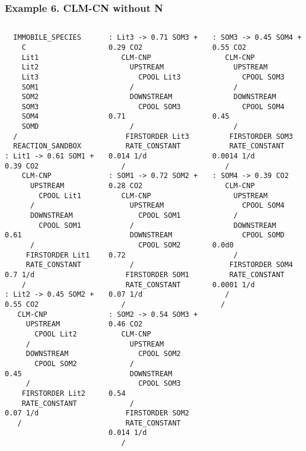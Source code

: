 \documentclass{beamer}
\begin{document}
\begin{frame}[fragile]
\frametitle{Example 6. CLM-CN without N}

\tiny
\begin{columns}
\column{1.5in}
\begin{verbatim}
  IMMOBILE_SPECIES
    C
    Lit1
    Lit2
    Lit3
    SOM1
    SOM2
    SOM3
    SOM4
    SOMD
  /
  REACTION_SANDBOX
: Lit1 -> 0.61 SOM1 + 0.39 CO2 
    CLM-CNP
      UPSTREAM
        CPOOL Lit1
      /
      DOWNSTREAM
        CPOOL SOM1 0.61
      /
     FIRSTORDER Lit1
     RATE_CONSTANT 0.7 1/d 
    /
: Lit2 -> 0.45 SOM2 + 0.55 CO2 
   CLM-CNP
     UPSTREAM
       CPOOL Lit2
     /
     DOWNSTREAM
       CPOOL SOM2 0.45
     /
    FIRSTORDER Lit2
    RATE_CONSTANT 0.07 1/d 
   /
\end{verbatim}  
\column{1.5in}
\begin{verbatim}   
: Lit3 -> 0.71 SOM3 + 0.29 CO2 
   CLM-CNP
     UPSTREAM
       CPOOL Lit3
     /
     DOWNSTREAM
       CPOOL SOM3 0.71
     /
    FIRSTORDER Lit3
    RATE_CONSTANT 0.014 1/d 
   /
: SOM1 -> 0.72 SOM2 + 0.28 CO2 
   CLM-CNP
     UPSTREAM
       CPOOL SOM1
     /
     DOWNSTREAM
       CPOOL SOM2 0.72
     /
    FIRSTORDER SOM1
    RATE_CONSTANT 0.07 1/d 
   /
: SOM2 -> 0.54 SOM3 + 0.46 CO2 
   CLM-CNP
     UPSTREAM
       CPOOL SOM2
     /
     DOWNSTREAM
       CPOOL SOM3 0.54
     /
    FIRSTORDER SOM2
    RATE_CONSTANT 0.014 1/d 
   /
\end{verbatim}  
\column{1.5in}
\begin{verbatim}   
: SOM3 -> 0.45 SOM4 + 0.55 CO2 
   CLM-CNP
     UPSTREAM
       CPOOL SOM3
     /
     DOWNSTREAM
       CPOOL SOM4 0.45
     /
    FIRSTORDER SOM3
    RATE_CONSTANT 0.0014 1/d 
   /
: SOM4 -> 0.39 CO2 
   CLM-CNP
     UPSTREAM
       CPOOL SOM4
     /
     DOWNSTREAM
       CPOOL SOMD 0.0d0
     /
    FIRSTORDER SOM4
    RATE_CONSTANT 0.0001 1/d 
   /
  /
\end{verbatim}  
\end{columns}
\end{frame}
\end{document}
